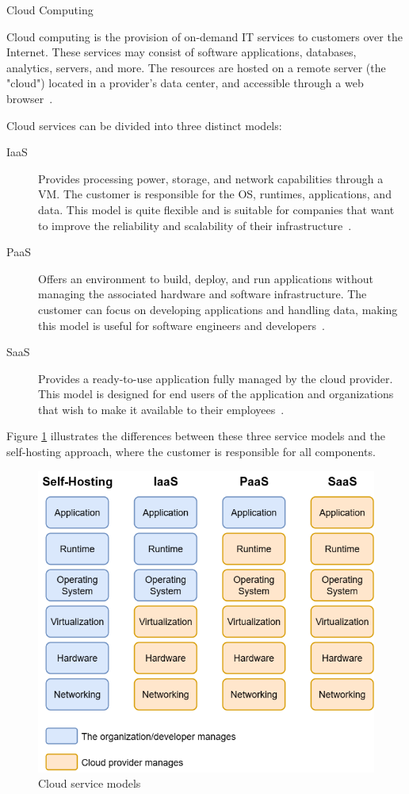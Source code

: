 \documentclass[12pt, reqno]{amsbook}
\makeatletter
\def\section{\@startsection{section}{1}%
      \z@{.5\linespacing\@plus.7\linespacing}{.25\linespacing}%
      {\normalfont\bfseries\flushleft}}
\theoremstyle{definition}
\theoremstyle{definition}
\numberwithin{section}{chapter}
\numberwithin{table}{chapter}
\numberwithin{figure}{chapter}
\makeatother
\begin{document}
\section{Cloud Computing}
\label{Section:Cloud_Computing}

Cloud computing is the provision of on-demand \ac{IT} services to customers over the Internet. These services may consist of software applications, databases, analytics, servers, and more. The resources are hosted on a remote server (the "cloud") located in a provider's data center, and accessible through a web browser~\cite{Figueira2024,  Nordic2012, Nadeem2024, Villamizar2016}.

Cloud services can be divided into three distinct models:
\begin{description}
  \item [\ac{IaaS}] Provides processing power, storage, and network capabilities through a \ac{VM}. The customer is responsible for the \ac{OS}, runtimes, applications, and data. This model is quite flexible and is suitable for companies that want to improve the reliability and scalability of their infrastructure~\cite{Figueira2024, Nordic2012, Google, Berry2021}.
  \item [\ac{PaaS}] Offers an environment to build, deploy, and run applications without managing the associated hardware and software infrastructure. The customer can focus on developing applications and handling data, making this model is useful for software engineers and developers~\cite{Figueira2024, Nordic2012, Google, Berry2021}.
  \item [\ac{SaaS}] Provides a ready-to-use application fully managed by the cloud provider. This model is designed for end users of the application and organizations that wish to make it available to their employees~\cite{Figueira2024, Nordic2012, Google, Berry2021}.
\end{description}

Figure \ref{Figure:CloudServiceModels} illustrates the differences between these three service models and the self-hosting approach, where the customer is responsible for all components.

\FloatBarrier
\begin{figure}[H]
  \includegraphics[width=0.7\linewidth]{images/CloudServiceModels.png}
  \caption{\label{Figure:CloudServiceModels}Cloud service models}
\end{figure}
\FloatBarrier
\end{document}
